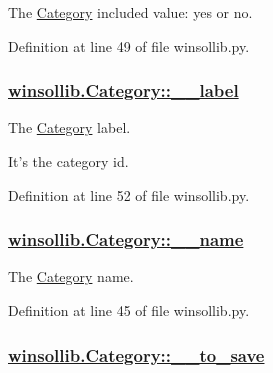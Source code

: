The \hyperlink{classwinsollib_1_1Category}{Category} included value: yes or no. 



Definition at line 49 of file winsollib.py.\hypertarget{classwinsollib_1_1Category_338710a520a7af2b63f420f1645a6fcc}{
\subsubsection[\_\-\_\-label]{\setlength{\rightskip}{0pt plus 5cm}\hyperlink{classwinsollib_1_1Category_338710a520a7af2b63f420f1645a6fcc}{winsollib.Category::\_\-\_\-label}}}
\label{classwinsollib_1_1Category_338710a520a7af2b63f420f1645a6fcc}


The \hyperlink{classwinsollib_1_1Category}{Category} label. 

It's the category id. 

Definition at line 52 of file winsollib.py.\hypertarget{classwinsollib_1_1Category_9d9c3c375dfdf0cbb19538a63e6400f0}{
\subsubsection[\_\-\_\-name]{\setlength{\rightskip}{0pt plus 5cm}\hyperlink{classwinsollib_1_1Category_9d9c3c375dfdf0cbb19538a63e6400f0}{winsollib.Category::\_\-\_\-name}}}
\label{classwinsollib_1_1Category_9d9c3c375dfdf0cbb19538a63e6400f0}


The \hyperlink{classwinsollib_1_1Category}{Category} name. 



Definition at line 45 of file winsollib.py.\hypertarget{classwinsollib_1_1Category_fc807dfc0cabe6235b1bcc1417fef611}{
\subsubsection[\_\-\_\-to\_\-save]{\setlength{\rightskip}{0pt plus 5cm}\hyperlink{classwinsollib_1_1Category_fc807dfc0cabe6235b1bcc1417fef611}{winsollib.Category::\_\-\_\-to\_\-save}}}
\label{classwinsollib_1_1Category_fc807dfc0cabe6235b1bcc1417fef611}



